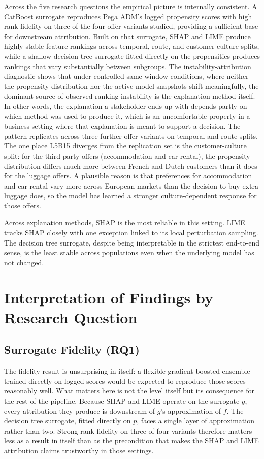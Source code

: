 \documentclass[oneside]{memoir} %
\begin{document}
Across the five research questions the empirical picture is internally consistent. A CatBoost surrogate reproduces Pega ADM's logged propensity scores with high rank fidelity on three of the four offer variants studied, providing a sufficient base for downstream attribution. Built on that surrogate, SHAP and LIME produce highly stable feature rankings across temporal, route, and customer-culture splits, while a shallow decision tree surrogate fitted directly on the propensities produces rankings that vary substantially between subgroups. The instability-attribution diagnostic shows that under controlled same-window conditions, where neither the propensity distribution nor the active model snapshots shift meaningfully, the dominant source of observed ranking instability is the explanation method itself. In other words, the explanation a stakeholder ends up with depends partly on which method was used to produce it, which is an uncomfortable property in a business setting where that explanation is meant to support a decision. The pattern replicates across three further offer variants on temporal and route splits. The one place L5B15 diverges from the replication set is the customer-culture split: for the third-party offers (accommodation and car rental), the propensity distribution differs much more between French and Dutch customers than it does for the luggage offers. A plausible reason is that preferences for accommodation and car rental vary more across European markets than the decision to buy extra luggage does, so the model has learned a stronger culture-dependent response for those offers.

Across explanation methods, SHAP is the most reliable in this setting. LIME tracks SHAP closely with one exception linked to its local perturbation sampling. The decision tree surrogate, despite being interpretable in the strictest end-to-end sense, is the least stable across populations even when the underlying model has not changed.

\section{Interpretation of Findings by Research Question}

\subsection{Surrogate Fidelity (RQ1)}

The fidelity result is unsurprising in itself: a flexible gradient-boosted ensemble trained directly on logged scores would be expected to reproduce those scores reasonably well. What matters here is not the level itself but its consequence for the rest of the pipeline. Because SHAP and LIME operate on the surrogate $g$, every attribution they produce is downstream of $g$'s approximation of $f$. The decision tree surrogate, fitted directly on $p$, faces a single layer of approximation rather than two. Strong rank fidelity on three of four variants therefore matters less as a result in itself than as the precondition that makes the SHAP and LIME attribution claims trustworthy in those settings.
\end{document}
